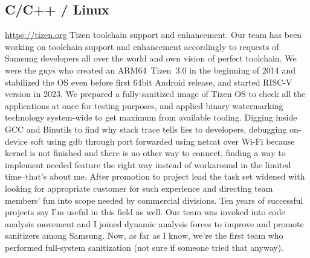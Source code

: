 \documentclass[11pt,a4paper]{moderncv}
\begin{document}
  \subsection{C/C++ / Linux}
  {\url{https://tizen.org}\newline{}
    Tizen toolchain support and enhancement.\newline{}
    Our team has been working on toolchain support and enhancement accordingly to requests of Samsung developers all over the
    world and own vision of perfect toolchain. We were the guys who created an ARM64~Tizen~3.0 in the beginning of 2014
    and stabilized the OS even before first 64bit Android release, and started RISC-V version in 2023.\newline{}
    We prepared a fully-sanitized image of Tizen OS to check all the applications at once for testing purposes, and
    applied binary watermarking technology system-wide to get maximum from available tooling.\newline{}
    Digging inside GCC and Binutils to find why stack trace tells lies to developers, debugging on-device soft using gdb
    through port forwarded using netcat over Wi-Fi because kernel is not finished and there is no other way to connect,
    finding a way to implement needed feature the right way instead of workaround in the limited time--that's about me.
    \newline{}
    After promotion to project lead the task set widened with looking for appropriate customer for such experience
    and directing team members' fun into scope needed by commercial divisions. Ten years of successful projects say
    I'm useful in this field as well.\newline{}
    Our team was invoked into code analysis movement and I joined dynamic analysis forces to improve and promote sanitizers
    among Samsung. Now, as far as I know, we're the first team who performed full-system sanitization (not sure if someone
    tried that anyway).
  }
\end{document}
